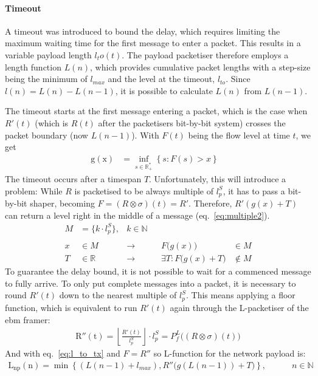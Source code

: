 \paragraph{Timeout}
A timeout was introduced to bound the delay, which requires limiting the maximum waiting time for the first message to enter a packet. This results in a variable payload length $l_to(t)$.
The payload packetiser therefore employs a length function $L(n)$,  which provides cumulative packet lengths with a step-size being the minimum of $l_{max}$ and the level at the timeout, $l_{to}$.
Since $l(n) = L(n) - L(n-1)$, it is possible to calculate $L(n)$ from $L(n-1)$. 
\par
The timeout starts at the first message entering a packet, which is the case when $R'(t)$ (which is $R(t)$ after the packetisers bit-by-bit system) crosses the packet boundary (now $L(n-1)$).
With $F(t)$ being the flow level at time $t$, we get
%
\begin{align}
\mathrm{g(x)}   &= \inf_{s \in \mathbb{R_+^*}}\left\{ s : F(s) > x \right\} &
\label{eq:tstartk}
\end{align}
%
The timeout occurs after a timespan $T$. Unfortunately, this will introduce a problem:
While $R$ is packetised to be always multiple of $l^S_p$, it has to pass a bit-by-bit shaper, becoming $F = (R \otimes \sigma)(t) = R'$.
Therefore, $R'(g(x) + T)$ can return a level right in the middle of a message (eq.~\ref{eq:multiple2}).
%
\begin{equation}
\begin{aligned}
M &= \{ k \cdot l^S_p\},& k \in \mathbb{N}&&&\\
\\
x &\in M &\to&&F\big(g(x)\big) &\in M\\
T &\in \mathbb{R}&\to&& \exists T  : F\big(g(x)+T\big) &\notin M
\label{eq:multiple2}
\end{aligned}
\end{equation}
%
To guarantee the delay bound, it is not possible to wait for a commenced message to fully arrive.
To only put complete messages into a packet, it is necessary to round $R'(t)$ down to the nearest multiple of $l^S_p$.
This means applying a floor function, which is equivalent to run $R'(t)$ again through the L-packetiser of the \gls{ebm} framer:
%
\begin{align}
\mathrm{R''(t)} = \left \lfloor{\frac{R'(t)}{l^S_p}}\right \rfloor  \cdot l^S_p = P^L_f\big((R \otimes \sigma)(t)\big)
\label{eq:l_to_tx}
\end{align}
%
And with eq.~\ref{eq:l_to_tx} and $F = R''$ so L-function for the network payload is:
%
\begin{align}
\mathrm{L_{np}(n)} =  \min \left \{(L(n-1) + l_{max}),  R''\big(g(L(n-1)) + T \big) \right \}, \hspace{3em} n \in \mathbb{N}
\label{eq:l_nw}
\end{align}
%
